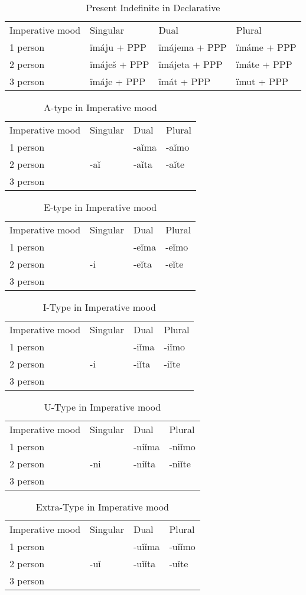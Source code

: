 \begin{table}[!htpb]
	\caption{Present Indefinite in Declarative}
	\begin{tabular}{llll}
		Imperative mood & Singular & Dual & Plural \\
		1 person & ïmáju + PPP & ïmájema + PPP & ïmáme + PPP \\
		2 person & ïmáješ + PPP & ïmájeta + PPP & ïmáte + PPP \\
		3 person & ïmáje + PPP & ïmát + PPP & ïmut + PPP
	\end{tabular}
\end{table}


\begin{table}[!htpb]
	\caption{A-type in Imperative mood}
	\begin{tabular}{llll}
		Imperative mood & Singular & Dual & Plural \\
		1 person &  & -aǐma & -aǐmo \\
		2 person & -aǐ & -aǐta & -aǐte \\
		3 person &  &  & 
	\end{tabular}
\end{table}

\begin{table}[!htpb]
	\caption{E-type in Imperative mood}
	\begin{tabular}{llll}
		Imperative mood & Singular & Dual & Plural \\
		1 person &  & -eǐma & -eǐmo \\
		2 person & -i & -eǐta & -eǐte \\
		3 person &  &  & 
	\end{tabular}
\end{table}

\begin{table}[!htpb]
	\caption{I-Type in Imperative mood}
	\begin{tabular}{llll}
		Imperative mood & Singular & Dual & Plural \\
		1 person &  & -iǐma & -iǐmo \\
		2 person & -i & -iǐta & -iǐte \\
		3 person &  &  & 
	\end{tabular}
\end{table}

\begin{table}[!htpb]
	\caption{U-Type in Imperative mood}
	\begin{tabular}{llll}
		Imperative mood & Singular & Dual & Plural \\
		1 person &  & -niǐma & -niǐmo \\
		2 person & -ni & -niǐta & -niǐte \\
		3 person &  &  & 
	\end{tabular}
\end{table}


\begin{table}[!htpb]
	\caption{Extra-Type in Imperative mood}
	\begin{tabular}{llll}
		Imperative mood & Singular & Dual & Plural \\
		1 person &  & -uǐǐma & -uǐǐmo \\
		2 person & -uǐ & -uǐǐta & -uǐte \\
		3 person &  &  & 
	\end{tabular}
\end{table}
